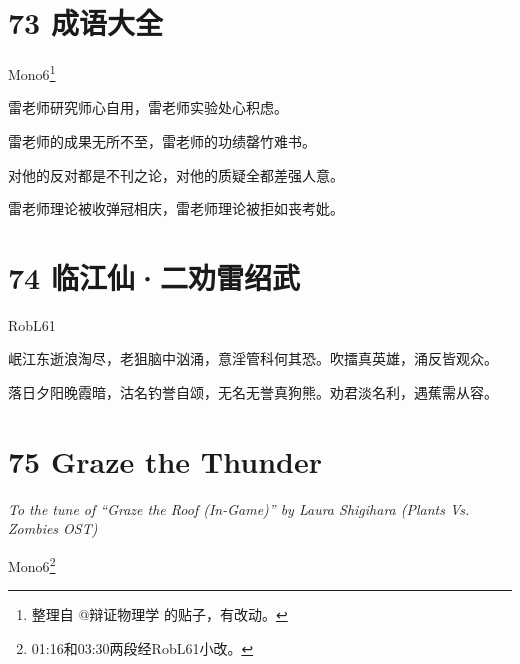 \documentclass[UTF8,12pt,oneside]{ctexbook}
\begin{document}
        \section{73 成语大全}
        \begin{center}
            Mono6\footnote{整理自 @辩证物理学 的贴子，有改动。}
        \end{center}
        
        雷老师研究师心自用，雷老师实验处心积虑。
        
        雷老师的成果无所不至，雷老师的功绩罄竹难书。
        
        对他的反对都是不刊之论，对他的质疑全都差强人意。
        
        雷老师理论被收弹冠相庆，雷老师理论被拒如丧考妣。
        
        \section{74 临江仙·二劝雷绍武}
        \begin{center}
            RobL61
        \end{center}
        
        岷江东逝浪淘尽，老狙脑中汹涌，意淫管科何其恐。吹擂真英雄，涌反皆观众。
        
        落日夕阳晚霞暗，沽名钓誉自颂，无名无誉真狗熊。劝君淡名利，遇蕉需从容。
        
        \newpage
        
        \section{75 Graze the Thunder}
        \begin{center}
            \textit{To the tune of “Graze the Roof (In-Game)” by Laura Shigihara (Plants Vs. Zombies OST)}
            
            Mono6\footnote{01:16和03:30两段经RobL61小改。}
        \end{center}
        
\end{document}
